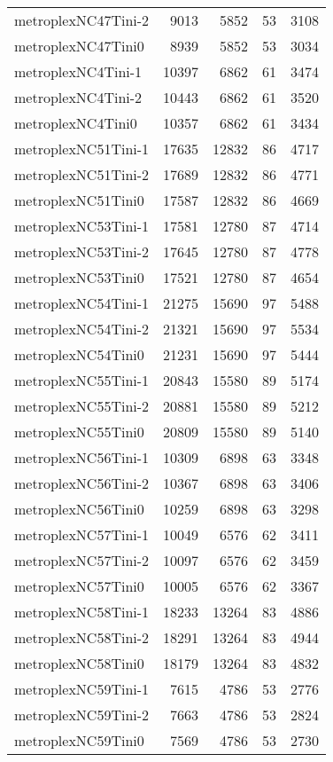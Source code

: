 \begin{tabular}{lrrrr}
metroplexNC47Tini-2 & 9013 & 5852 & 53 & 3108 \\
metroplexNC47Tini0 & 8939 & 5852 & 53 & 3034 \\
metroplexNC4Tini-1 & 10397 & 6862 & 61 & 3474 \\
metroplexNC4Tini-2 & 10443 & 6862 & 61 & 3520 \\
metroplexNC4Tini0 & 10357 & 6862 & 61 & 3434 \\
metroplexNC51Tini-1 & 17635 & 12832 & 86 & 4717 \\
metroplexNC51Tini-2 & 17689 & 12832 & 86 & 4771 \\
metroplexNC51Tini0 & 17587 & 12832 & 86 & 4669 \\
metroplexNC53Tini-1 & 17581 & 12780 & 87 & 4714 \\
metroplexNC53Tini-2 & 17645 & 12780 & 87 & 4778 \\
metroplexNC53Tini0 & 17521 & 12780 & 87 & 4654 \\
metroplexNC54Tini-1 & 21275 & 15690 & 97 & 5488 \\
metroplexNC54Tini-2 & 21321 & 15690 & 97 & 5534 \\
metroplexNC54Tini0 & 21231 & 15690 & 97 & 5444 \\
metroplexNC55Tini-1 & 20843 & 15580 & 89 & 5174 \\
metroplexNC55Tini-2 & 20881 & 15580 & 89 & 5212 \\
metroplexNC55Tini0 & 20809 & 15580 & 89 & 5140 \\
metroplexNC56Tini-1 & 10309 & 6898 & 63 & 3348 \\
metroplexNC56Tini-2 & 10367 & 6898 & 63 & 3406 \\
metroplexNC56Tini0 & 10259 & 6898 & 63 & 3298 \\
metroplexNC57Tini-1 & 10049 & 6576 & 62 & 3411 \\
metroplexNC57Tini-2 & 10097 & 6576 & 62 & 3459 \\
metroplexNC57Tini0 & 10005 & 6576 & 62 & 3367 \\
metroplexNC58Tini-1 & 18233 & 13264 & 83 & 4886 \\
metroplexNC58Tini-2 & 18291 & 13264 & 83 & 4944 \\
metroplexNC58Tini0 & 18179 & 13264 & 83 & 4832 \\
metroplexNC59Tini-1 & 7615 & 4786 & 53 & 2776 \\
metroplexNC59Tini-2 & 7663 & 4786 & 53 & 2824 \\
metroplexNC59Tini0 & 7569 & 4786 & 53 & 2730 \\

\end{tabular}

